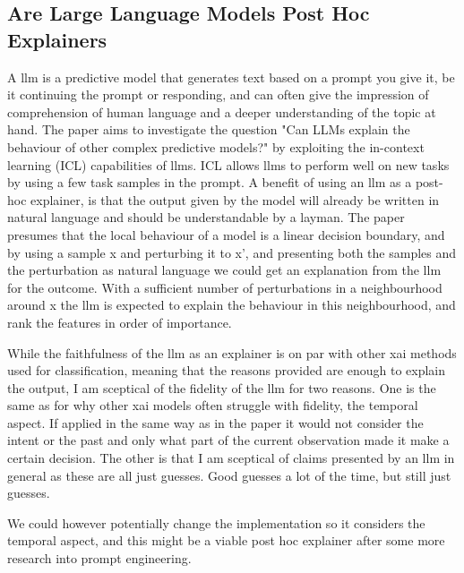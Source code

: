 \documentclass[UKenglish]{uiomasterthesis}
\begin{document}
\subsection{Are Large Language Models Post Hoc Explainers}
A \ac{llm} is a predictive model that generates text based on a prompt you give it, be it continuing the prompt or responding, and can often give the impression of comprehension of human language and a deeper understanding of the topic at hand.  The paper aims to investigate the question "Can LLMs explain the behaviour of other complex predictive models?" by exploiting the in-context learning (ICL) capabilities of \acp{llm}. ICL allows \acp{llm} to perform well on new tasks by using a few task samples in the prompt. A benefit of using an \ac{llm} as a post-hoc explainer, is that the output given by the model will already be written in natural language and should be understandable by a layman. The paper presumes that the local behaviour of a model is a linear decision boundary, and by using a sample x and perturbing it to x', and presenting both the samples and the perturbation as natural language we could get an explanation from the \ac{llm} for the outcome. With a sufficient number of perturbations in a neighbourhood around x the \ac{llm} is expected to explain the behaviour in this neighbourhood, and rank the features in order of importance.

While the faithfulness of the \ac{llm} as an explainer is on par with other \ac{xai} methods used for classification, meaning that the reasons provided are enough to explain the output, I am sceptical of the fidelity of the \ac{llm} for two reasons. One is the same as for why other \ac{xai} models often struggle with fidelity, the temporal aspect. If applied in the same way as in the paper it would not consider the intent or the past and only what part of the current observation made it make a certain decision. The other is that I am sceptical of claims presented by an \ac{llm} in general as these are all just guesses. Good guesses a lot of the time, but still just guesses. 

We could however potentially change the implementation so it considers the temporal aspect, and this might be a viable post hoc explainer after some more research into prompt engineering.
\end{document}
